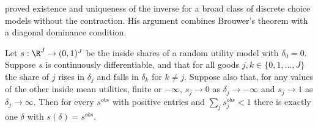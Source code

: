\citet[Appendix]{Berry1994} proved existence and uniqueness of the inverse for a broad class of discrete
choice models without the contraction. His argument combines Brouwer's theorem with a diagonal dominance
condition.

\begin{proposition}\label{prop:B-berry-inverse}
Let $s: \R^J \to (0,1)^J$ be the inside shares of a random utility model with $\delta_0 = 0$. Suppose $s$ is
continuously differentiable, and that for all goods $j, k \in \{0, 1, \dots, J\}$ the share of $j$ rises in
$\delta_j$ and falls in $\delta_k$ for $k \neq j$. Suppose also that, for any values of the other inside mean
utilities, finite or $-\infty$, $s_j \to 0$ as $\delta_j \to -\infty$ and $s_j \to 1$ as $\delta_j \to \infty$. Then for every $s^{obs}$ with positive entries and $\sum_j
s^{obs}_j < 1$ there is exactly one $\delta$ with $s(\delta) = s^{obs}$.
\end{proposition}

